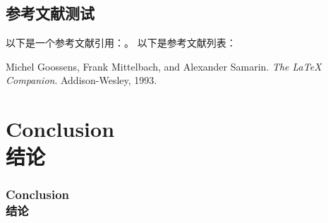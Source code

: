 \documentclass[aspectratio=169]{beamer}
\begin{document}
\subsection{参考文献测试}
\begin{frame}
以下是一个参考文献引用：\cite{latexcompanion}。
\framebreak%
以下是参考文献列表：
\begin{thebibliography}{9}
Michel Goossens, Frank Mittelbach, and Alexander Samarin.
\textit{The LaTeX Companion}.
Addison-Wesley, 1993.
\end{thebibliography}
\end{frame}

\section{Conclusion\\结论}
\begin{frame}
\frametitle{Conclusion\\结论}
\lipsum[3]
\end{frame}

\begin{frame}
\zhlipsum[3]
\end{frame}
\end{document}
